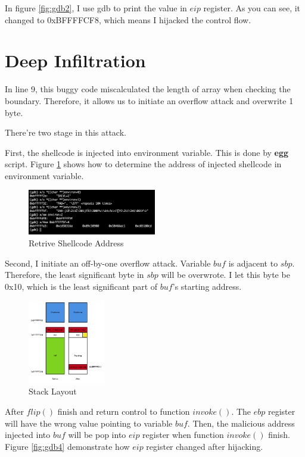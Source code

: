 \documentclass{article}
\begin{document}
In figure \ref{fig:gdb2}, I use gdb to print the value in $eip$ register. As you can see, it changed to 0xBFFFFCF8, which means I hijacked the control flow.

\newpage
\section{Deep Infiltration}

In line 9, this buggy code miscalculated the length of array when checking the boundary. Therefore, it allows us to initiate an overflow attack and overwrite 1 byte.

There're two stage in this attack. 

First, the shellcode is injected into environment variable. This is done by \textbf{egg} script.  Figure \ref{fig:gdb3} shows how to determine the address of injected shellcode in environment variable.

\begin{figure}[h]
\centering
\includegraphics[width=0.5\textwidth]{gdb3.png}
\caption{\label{fig:gdb3}Retrive Shellcode Address}
\end{figure}

Second, I initiate an off-by-one overflow attack. Variable $buf$ is adjacent to $sbp$. Therefore, the least significant byte in $sbp$ will be overwrote. I let this byte be 0x10, which is the least significant part of $buf$'s starting address.

 \begin{figure}[h]
\centering
\includegraphics[width=0.3\textwidth]{stack3.png}
\caption{\label{fig:stack3}Stack Layout}
\end{figure}

After $flip()$ finish and return control to function $invoke()$. The $ebp$ register will have the wrong value pointing to variable $buf$. Then, the malicious address injected into $buf$ will be pop into $eip$ register when function $invoke()$ finish. Figure \ref{fig:gdb4} demonstrate how $eip$ register changed after hijacking.
\end{document}
